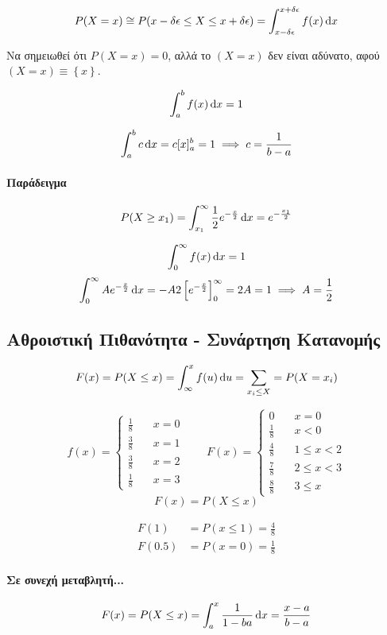 \documentclass[11pt,a4paper,titlepage,draft]{article}
\begin{document}
\[
P(X=x) \cong P (x-\delta\epsilon \leq X \leq x+\delta\epsilon) = \int_{x-\delta\epsilon}^{x+\delta\epsilon} f(x) \dif x
\]

Να σημειωθεί ότι \(P(X=x) = 0\), αλλά το \((X=x)\) δεν είναι αδύνατο, αφού \((X=x) \equiv  \left\lbrace x \right\rbrace\).

\[
\int_a^b f(x) \dif x = 1
\]

\[
\int_a^b c \dif x =c [x]_a^b = 1 \implies c = \frac{1}{b-a}
\]

\paragraph{Παράδειγμα}
\[
P(X \geq x_1) = \int_{x_1}^\infty \frac{1}{2}e^{-\frac{x}{2}} \dif x = e^{-\frac{x_1}{2}}
\]

\[
\int_0^\infty f(x)\dif x = 1
\]
\[
\int_0^\infty Ae^{-\frac{x}{2}} \dif x = -A2\left[ e^{-\frac{x}{2}}\right]_0^\infty = 2A =1
\implies A=\frac{1}{2}
\]

\subsection{Αθροιστική Πιθανότητα - Συνάρτηση Κατανομής}
\[
F(x) = P(X \leq x) = \int_{\infty}^x f(u) \dif u = \sum_{x_i \leq X} =P(X=x_i)
\]

\[
f(x)=
\begin{cases}
\frac{1}{8} \quad& x=0\\
\frac{3}{8} \quad& x=1\\
\frac{3}{8} \quad& x=2\\
\frac{1}{8} \quad& x=3
\end{cases}
\qquad
F(x)=
\begin{cases}
0 \quad& x=0\\
\frac{1}{8} \quad& x<0\\
\frac{4}{8} \quad& 1 \leq x < 2\\
\frac{7}{8} \quad& 2 \leq x < 3\\
\frac{8}{8} \quad& 3\leq x
\end{cases}
\]
\[
F(x) = P(X \leq x)
\]

\begin{align*}
F(1) &= P(x \leq 1) =\frac{4}{8}\\
F(0.5) &= P(x=0) = \frac{1}{8}
\end{align*}

\paragraph{Σε συνεχή μεταβλητή...}
\[
F(x) = P(X \leq x) = \int_a^x \frac{1}{1-ba} \dif x = \frac{x-a}{b-a}
\]
\end{document}
